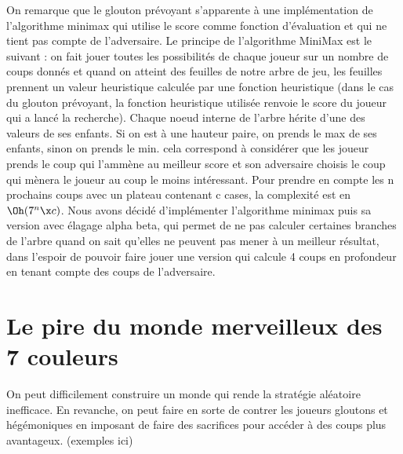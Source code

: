 \documentclass[12pt,S,fira-sans]{paper}
\begin{document}
\begin{qu}
    On remarque que le glouton prévoyant s'apparente à une implémentation de l'algorithme minimax qui utilise le score comme fonction d'évaluation et qui ne tient pas compte de l'adversaire.
    Le principe de l'algorithme MiniMax est le suivant : on fait jouer toutes les possibilités de chaque joueur sur un nombre de coups donnés et quand on atteint des feuilles de notre arbre de jeu, les feuilles prennent un valeur heuristique calculée par une fonction heuristique (dans le cas du glouton prévoyant, la fonction heuristique utilisée renvoie le score du joueur qui a lancé la recherche). Chaque noeud interne de l'arbre hérite d'une des valeurs de ses enfants. Si on est à une hauteur paire, on prends le max de ses enfants, sinon on prends le min. cela correspond à considérer que les joueur prends le coup qui l'ammène au meilleur score et son adversaire choisis le coup qui mènera le joueur au coup le moins intéressant. 
    Pour prendre en compte les n prochains coups avec un plateau contenant c cases, la complexité est en \(\Oh(7^n \x c)\).
    Nous avons décidé d'implémenter l'algorithme minimax puis sa version avec élagage alpha beta, qui permet de ne pas calculer certaines branches de l'arbre quand on sait qu'elles ne peuvent pas mener à un meilleur résultat, dans l'espoir de pouvoir faire jouer une version qui calcule 4 coups en profondeur en tenant compte des coups de l'adversaire.
\end{qu}

\section{Le pire du monde merveilleux des 7 couleurs}

\begin{qu}
    On peut difficilement construire un monde qui rende la stratégie aléatoire inefficace.
    En revanche, on peut faire en sorte de contrer les joueurs gloutons et hégémoniques en imposant de faire des sacrifices pour accéder à des coups plus avantageux.
    (exemples ici)
\end{qu}
\end{document}
